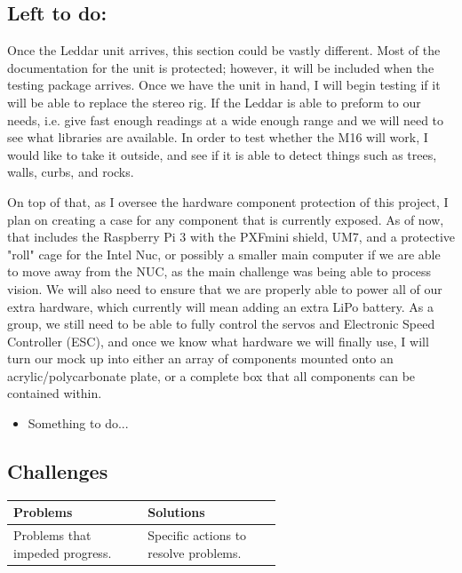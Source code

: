 \documentclass[compsoc,draftclsnofoot,onecolumn,10pt]{IEEEtran}
\begin{document}
		
		
	\subsection{Left to do:}
		Once the Leddar unit arrives, this section could be vastly different. Most of the documentation for the unit is protected; however, it will be included when the testing package arrives. 
		Once we have the unit in hand, I will begin testing if it will be able to replace the stereo rig. 
		If the Leddar is able to preform to our needs, i.e. give fast enough readings at a wide enough range and we will need to see what libraries are available. 
		In order to test whether the M16 will work, I would like to take it outside, and see if it is able to detect things such as trees, walls, curbs, and rocks. 
			
		On top of that, as I oversee the hardware component protection of this project, I plan on creating a case for any component that is currently exposed. 
		As of now, that includes the Raspberry Pi 3 with the PXFmini shield, UM7, and a protective "roll" cage for the Intel Nuc, or possibly a smaller main computer if we are able to move away from the NUC, as the main challenge was being able to process vision. 
		We will also need to ensure that we are properly able to power all of our extra hardware, which currently will mean adding an extra LiPo battery.
		As a group, we still need to be able to fully control the servos and Electronic Speed Controller (ESC), and once we know what hardware we will finally use, I will turn our mock up into either an array of components mounted onto an acrylic/polycarbonate plate, or a complete box that all components can be contained within. 
		\begin{itemize}
			\item Something to do...
		\end{itemize}
	\subsection{Challenges}
		
		\begin{tabular}{|p{0.3\linewidth}|p{0.3\linewidth}|}
			\hline
			\textbf{Problems} & \textbf{Solutions}\\
			\hline
			Problems that impeded progress. & Specific actions to resolve problems.\\
			\hline
						
		\end{tabular}
		
\end{document}
